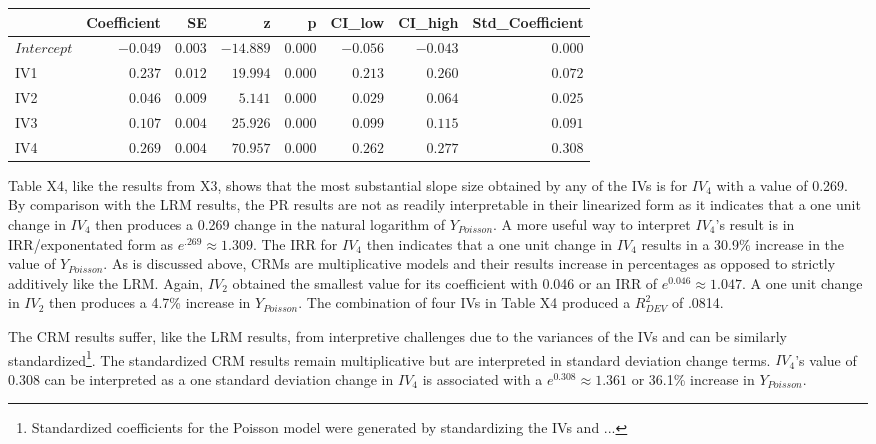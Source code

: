 \documentclass[ShortAfour,times,sageapa]{sagej}
\begin{document}
	\begin{longtable}{l|rrrrrrr}
		\toprule
		\multicolumn{1}{l}{} & Coefficient & SE & z & p & CI\_low & CI\_high & Std\_Coefficient \\ 
		\midrule
		\(Intercept\) & $-0.049$ & $0.003$ & $-14.889$ & $0.000$ & $-0.056$ & $-0.043$ & $0.000$ \\ 
		IV1 & $0.237$ & $0.012$ & $19.994$ & $0.000$ & $0.213$ & $0.260$ & $0.072$ \\ 
		IV2 & $0.046$ & $0.009$ & $5.141$ & $0.000$ & $0.029$ & $0.064$ & $0.025$ \\ 
		IV3 & $0.107$ & $0.004$ & $25.926$ & $0.000$ & $0.099$ & $0.115$ & $0.091$ \\ 
		IV4 & $0.269$ & $0.004$ & $70.957$ & $0.000$ & $0.262$ & $0.277$ & $0.308$ \\ 
		\bottomrule
	\end{longtable}
	
	Table X4, like the results from X3, shows that the most substantial slope size obtained by any of the IVs is for $IV_4$ with a value of 0.269.
	By comparison with the LRM results, the PR results are not as readily interpretable in their linearized form as it indicates that a one unit change in $IV_4$ then produces a 0.269 change in the natural logarithm of $Y_{Poisson}$.
	A more useful way to interpret $IV_4$'s result is in IRR/exponentated form as $e^{.269} \approx 1.309$.
	The IRR for $IV_4$ then indicates that a one unit change in $IV_4$ results in a 30.9\% increase in the value of $Y_{Poisson}$.
	As is discussed above, CRMs are multiplicative models and their results increase in percentages as opposed to strictly additively like the LRM.
	Again, $IV_2$ obtained the smallest value for its coefficient with 0.046 or an IRR of $e^{0.046} \approx 1.047$.
	A one unit change in $IV_2$ then produces a 4.7\% increase in $Y_{Poisson}$.
	The combination of four IVs in Table X4 produced a $R^2_{DEV}$ of .0814.
	
	The CRM results suffer, like the LRM results, from interpretive challenges due to the variances of the IVs and can be similarly standardized\footnote{Standardized coefficients for the Poisson model were generated by standardizing the IVs and ...}.
	The standardized CRM results remain multiplicative but are interpreted in standard deviation change terms.
	$IV_4$'s value of 0.308 can be interpreted as a one standard deviation change in $IV_4$ is associated with a $e^{0.308} \approx 1.361$ or 36.1\% increase in $Y_{Poisson}$.
	
\end{document}
